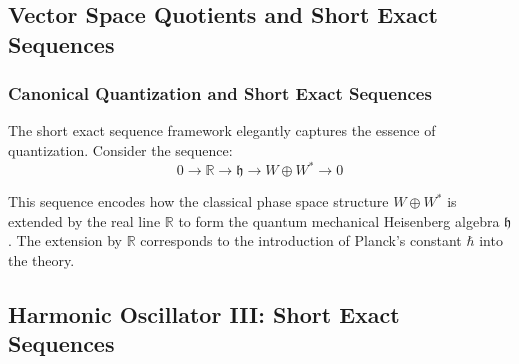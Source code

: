 \subsection{Vector Space Quotients and Short Exact Sequences}





\subsubsection{Canonical Quantization and Short Exact Sequences}

The short exact sequence framework elegantly captures the essence of quantization. Consider the sequence:
\begin{equation}
0 \rightarrow \mathbb{R} \rightarrow \mathfrak{h} \rightarrow W\oplus W^* \rightarrow 0
\end{equation}

This sequence encodes how the classical phase space structure $W\oplus W^*$ is extended by the real line $\mathbb{R}$ to form the quantum mechanical Heisenberg algebra $\mathfrak{h}$. The extension by $\mathbb{R}$ corresponds to the introduction of Planck's constant $\hbar$ into the theory.

\subsection{Harmonic Oscillator III: Short Exact Sequences}

